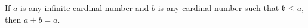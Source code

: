 If $a$ is any infinite cardinal number and $b$ is any cardinal number such that $\mathfrak{b} \leq a$, then $a + b = a$.
